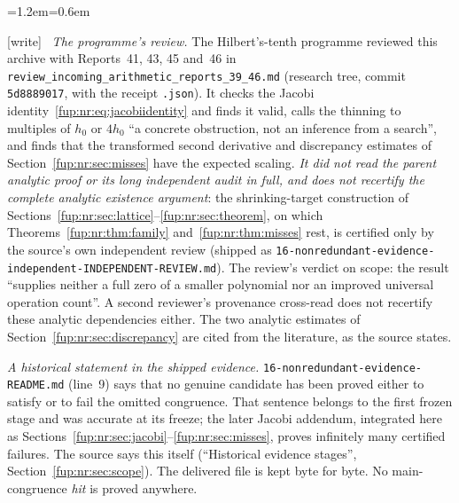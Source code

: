 \documentclass[11pt,letterpaper]{article}
\theoremstyle{definition}\newtheorem{definition}[theorem]{Definition}
\theoremstyle{remark}\newtheorem{remark}[theorem]{Remark}
\newcommand{\wtag}{\textup{[write]}}
\newenvironment{writenote}{\par\smallskip\begin{list}{}{\leftmargin=1.2em\rightmargin=0.6em}\item[]\small\wtag\ }{\end{list}\smallskip}
\newcommand{\rw}[1]{\nolinkurl{#1}}%
\begin{document}
\begin{writenote}
\emph{The programme's review.} The Hilbert's-tenth programme reviewed this archive with Reports~41, 43, 45 and~46 in \rw{review_incoming_arithmetic_reports_39_46.md} (research tree, commit \texttt{5d8889017}, with the receipt \rw{.json}). It checks the Jacobi identity~\eqref{fup:nr:eq:jacobiidentity} and finds it valid, calls the thinning to multiples of $h_0$ or $4h_0$ ``a concrete obstruction, not an inference from a search'', and finds that the transformed second derivative and discrepancy estimates of Section~\ref{fup:nr:sec:misses} have the expected scaling. \emph{It did not read the parent analytic proof or its long independent audit in full, and does not recertify the complete analytic existence argument}: the shrinking-target construction of Sections~\ref{fup:nr:sec:lattice}--\ref{fup:nr:sec:theorem}, on which Theorems~\ref{fup:nr:thm:family} and~\ref{fup:nr:thm:misses} rest, is certified only by the source's own independent review (shipped as \rw{16-nonredundant-evidence-independent-INDEPENDENT-REVIEW.md}). The review's verdict on scope: the result ``supplies neither a full zero of a smaller polynomial nor an improved universal operation count''. A second reviewer's provenance cross-read does not recertify these analytic dependencies either. The two analytic estimates of Section~\ref{fup:nr:sec:discrepancy} are cited from the literature, as the source states.

\emph{A historical statement in the shipped evidence.} \rw{16-nonredundant-evidence-README.md} (line~9) says that no genuine candidate has been proved either to satisfy or to fail the omitted congruence. That sentence belongs to the first frozen stage and was accurate at its freeze; the later Jacobi addendum, integrated here as Sections~\ref{fup:nr:sec:jacobi}--\ref{fup:nr:sec:misses}, proves infinitely many certified failures. The source says this itself (``Historical evidence stages'', Section~\ref{fup:nr:sec:scope}). The delivered file is kept byte for byte. No main-congruence \emph{hit} is proved anywhere.


\end{writenote}
\end{document}
